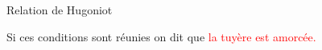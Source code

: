 \begin{frame}{Relation de Hugoniot}
\begin{itemize}

\pause 
\medskip

	
\end{itemize}

Si ces conditions sont réunies on dit que \textcolor{red}{ la tuyère est amorcée.}







\vspace{0mm}

\end{frame}



%
%
%
%
%
%
%
%
%

